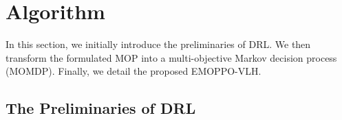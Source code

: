 \documentclass[10pt,journal,compsoc]{IEEEtran}
\begin{document}








\section{Algorithm}
\label{sec:algorithm}

\par In this section, we initially introduce the preliminaries of DRL. We then transform the formulated MOP into a multi-objective Markov decision process (MOMDP). Finally, we detail the proposed EMOPPO-VLH.

%
%
\subsection{The Preliminaries of DRL}
\end{document}

